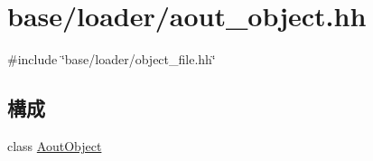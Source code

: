 \hypertarget{aout__object_8hh}{
\section{base/loader/aout\_\-object.hh}
\label{aout__object_8hh}
}
{\ttfamily \#include \char`\"{}base/loader/object\_\-file.hh\char`\"{}}\par
\subsection*{構成}
\begin{DoxyCompactItemize}
\item 
class \hyperlink{classAoutObject}{AoutObject}
\end{DoxyCompactItemize}
